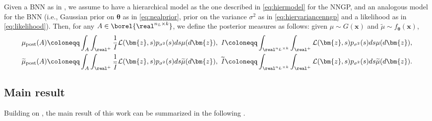 \begin{definition} \label{def:postnngpbnn}
    Given a BNN as in , we assume to have a hierarchical model as the one described in \cref{eq:hiermodel} for the NNGP, and an analogous model for the BNN (i.e., Gaussian prior on $\bm{\theta}$ as in \cref{eq:nealprior}, prior on the variance $\sigma^2$ as in \cref{eq:hiervariancenngp} and a likelihood as in \cref{eq:likelihood}). Then, for any $A \in \borel{\real^{n_L \times k}}$, we define the posterior measures as follows: given $\mu \sim G(\bm{x})$ and $\widetilde{\mu} \sim f_{\bm{\theta}}(\bm{x})$,
    \begin{equation*}
        \begin{aligned}
            & \mu_{\mathrm{post}}(A) \coloneqq \int_A \int_{\real^+} \frac{1}{\mathit{I}} \mathcal{L}(\bm{z}, s) p_{\sigma^2}(s) ds \mu(d\bm{z}), \ \mathit{I} \coloneqq \int_{\real^{n_L \times k}} \int_{\real^+} \mathcal{L}(\bm{z}, s) p_{\sigma^2}(s) ds \mu(d\bm{z}), \\
            & \widetilde{\mu}_{\mathrm{post}}(A) \coloneqq \int_A \int_{\real^+} \frac{1}{\widetilde{\mathit{I}}} \mathcal{L}(\bm{z}, s) p_{\sigma^2}(s) ds \widetilde{\mu}(d\bm{z}), \ \widetilde{\mathit{I}} \coloneqq \int_{\real^{n_L \times k}} \int_{\real^+} \mathcal{L}(\bm{z}, s) p_{\sigma^2}(s) ds \widetilde{\mu}(d\bm{z}).
        \end{aligned}
    \end{equation*}
\end{definition}

\subsection{Main result}

Building on , the main result of this work can be summarized in the following .

